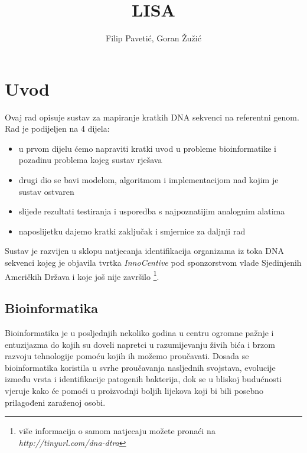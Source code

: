 \documentclass[times, utf8, diplomski]{fer}
\begin{document}
\title{LISA}

\author{Filip Paveti\'{c}, Goran \v{Z}u\v{z}i\'{c}}

\maketitle

\zahvala{}

\tableofcontents

\chapter{Uvod}
Ovaj rad opisuje sustav za mapiranje kratkih DNA sekvenci na referentni genom. Rad je podijeljen na 4 dijela:
\begin{itemize}
\item u prvom dijelu ćemo napraviti kratki uvod u probleme bioinformatike i pozadinu problema kojeg sustav rješava
\item drugi dio se bavi modelom, algoritmom i implementacijom nad kojim je sustav ostvaren
\item slijede rezultati testiranja i usporedba s najpoznatijim analognim alatima
\item naposlijetku dajemo kratki zaključak i smjernice za daljnji rad
\end{itemize}

Sustav je razvijen u sklopu natjecanja identifikacija organizama iz toka DNA sekvenci
kojeg je objavila tvrtka \emph{InnoCentive} pod sponzorstvom vlade Sjedinjenih Američkih Država
i koje još nije završilo \footnote{više informacija o samom natjecaju možete pronaći na \emph{http://tinyurl.com/dna-dtra}}.

\section{Bioinformatika}

Bioinformatika je u posljednjih nekoliko godina u centru ogromne pažnje i entuzijazma do kojih su
doveli napretci u razumijevanju živih bića i brzom razvoju tehnologije pomoću kojih ih možemo proučavati.
Dosada se bioinformatika koristila u svrhe proučavanja nasljednih svojstava, evolucije između vrsta i identifikacije
patogenih bakterija, dok se u bliskoj budućnosti vjeruje kako će pomoći u proizvodnji boljih lijekova koji bi bili
posebno prilagođeni zaraženoj osobi.
\end{document}
